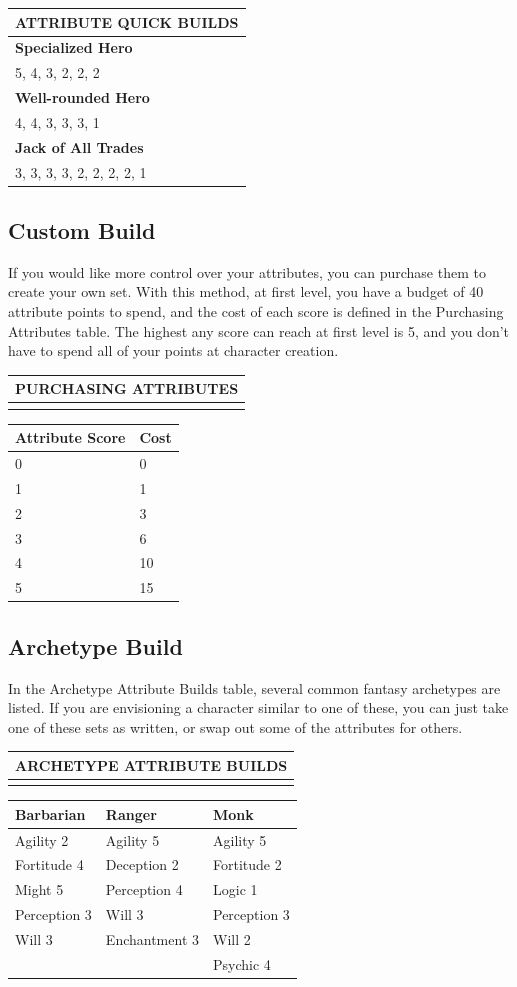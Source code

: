 \documentclass[12pt]{report}
\begin{document}
\begin{longtable}[c]{@{}l@{}}
\toprule
ATTRIBUTE QUICK BUILDS\tabularnewline
\midrule
\endhead
\textbf{Specialized Hero}\tabularnewline
5, 4, 3, 2, 2, 2\tabularnewline
\textbf{Well-rounded Hero}\tabularnewline
4, 4, 3, 3, 3, 1\tabularnewline
\textbf{Jack of All Trades}\tabularnewline
3, 3, 3, 3, 2, 2, 2, 2, 1\tabularnewline
\bottomrule
\end{longtable}

\subsection{Custom Build}\label{custom-build}

If you would like more control over your attributes, you can purchase
them to create your own set. With this method, at first level, you have
a budget of 40 attribute points to spend, and the cost of each score is
defined in the Purchasing Attributes table. The highest any score can
reach at first level is 5, and you don't have to spend all of your
points at character creation.

\begin{longtable}[c]{@{}l@{}}
\toprule
PURCHASING ATTRIBUTES\tabularnewline
\midrule
\endhead
\tabularnewline
\bottomrule
\end{longtable}

\begin{longtable}[c]{@{}ll@{}}
\toprule
Attribute Score & Cost\tabularnewline
\midrule
\endhead
0 & 0\tabularnewline
1 & 1\tabularnewline
2 & 3\tabularnewline
3 & 6\tabularnewline
4 & 10\tabularnewline
5 & 15\tabularnewline
\bottomrule
\end{longtable}

\subsection{Archetype Build}\label{archetype-build}

In the Archetype Attribute Builds table, several common fantasy
archetypes are listed. If you are envisioning a character similar to one
of these, you can just take one of these sets as written, or swap out
some of the attributes for others.

\begin{longtable}[c]{@{}l@{}}
\toprule
ARCHETYPE ATTRIBUTE BUILDS\tabularnewline
\midrule
\endhead
\tabularnewline
\bottomrule
\end{longtable}

\begin{longtable}[c]{@{}lll@{}}
\toprule
Barbarian & Ranger & Monk\tabularnewline
\midrule
\endhead
Agility 2 & Agility 5 & Agility 5\tabularnewline
Fortitude 4 & Deception 2 & Fortitude 2\tabularnewline
Might 5 & Perception 4 & Logic 1\tabularnewline
Perception 3 & Will 3 & Perception 3\tabularnewline
Will 3 & Enchantment 3 & Will 2\tabularnewline
& & Psychic 4\tabularnewline
\bottomrule
\end{longtable}
\end{document}

